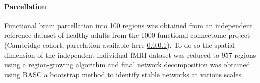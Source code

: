 \documentclass[authoryear,preprint,review]{elsarticle}
\begin{document}

\paragraph{Parcellation}
Functional brain parcellation into 100 regions was obtained from an independent reference dataset of healthy adults from the 1000 functional connectome project (Cambridge cohort, parcelation available here \ref{}). To do so the spatial dimension of the independent individual fMRI dataset was reduced to 957 regions using a region-growing algorithm \cite{Bellec2006} and final network decomposition was obtained using BASC \cite{Bellec2010c} a bootstrap method to identify stable networks at various scales.
\end{document}

